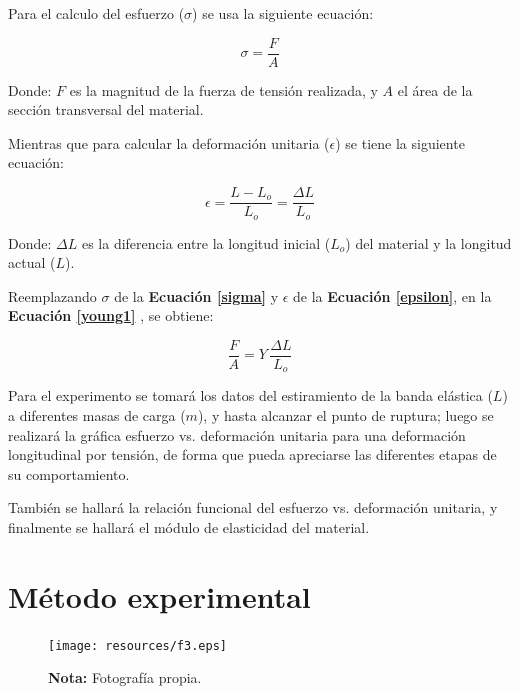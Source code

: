 \documentclass[letter,11pt]{article}
\newcommand{\source}[1]{\vspace{-11pt} \caption*{\small{\textbf{Nota:} {#1}}}}
\begin{document}
Para el calculo del esfuerzo ($\sigma$) se usa la siguiente ecuación:

\begin{equation}
    \sigma = \frac{F}{A}
\label{sigma}
\end{equation}
\vspace{0.10cm}

Donde: $F$ es la magnitud de la fuerza de tensión realizada, y $A$ el área de la
sección transversal del material.

Mientras que para calcular la deformación unitaria ($\epsilon$) se tiene la
siguiente ecuación:

\begin{equation}
    \epsilon = \frac{L - L_o}{L_o} = \frac{\Delta L}{L_o}
\label{epsilon}
\end{equation}
\vspace{0.10cm}

Donde: $\Delta L$ es la diferencia entre la longitud inicial ($L_o$) del
material y la longitud actual ($L$).

Reemplazando $\sigma$ de la \textbf{Ecuación \ref{sigma}} y $\epsilon$  de la
\textbf{Ecuación \ref{epsilon}}, en la \textbf{Ecuación \ref{young1}}
\cite{GUIA}, se obtiene:

\begin{equation}
    \frac{F}{A} = Y\,\frac{\Delta L}{L_o}
\label{young2}
\end{equation}
\vspace{0.10cm}

Para el experimento se tomará los datos del estiramiento de la banda elástica
($L$) a diferentes masas de carga ($m$), y hasta alcanzar el punto de ruptura;
luego se realizará la gráfica esfuerzo vs. deformación unitaria para una
deformación longitudinal por tensión, de forma que pueda apreciarse las
diferentes etapas de su comportamiento.

También se hallará la relación funcional del esfuerzo vs. deformación unitaria,
y finalmente se hallará el módulo de elasticidad del material.

\section{Método experimental}

\begin{figure}
\centering
\texttt{[image: resources/f3.eps]}
\caption{Montaje del experimento.}
\label{figura3}
\source{Fotografía propia.}
\end{figure}
\end{document}
